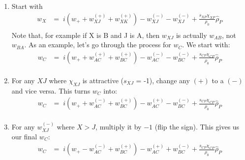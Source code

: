 \documentclass{article}
\begin{document}
  \begin{enumerate}
    \item Start with
    {
      \begin{align*}
        w_X &=\;
          i \left( w_+ + w_{XJ}^{(+)} + w_{XK}^{(+)} \right)
          - w_{XJ}^{(-)} - w_{XJ}^{(-)}
          + \frac{s_{XP}\chi_{XP}}{\rho_0} \hat{\rho}_P \\
      \end{align*}
    }
    Note that, for example if X is B and J is A, then $w_{XJ}$ is actually $w_{AB}$,
      not $w_{BA}$.
    As an example, let's go through the process for $w_C$.
    We start with:
    {
      \begin{align*}
        w_C &=\;
          i \left( w_+ + w_{AC}^{(+)} + w_{BC}^{(+)} \right)
          - w_{AC}^{(-)} - w_{BC}^{(-)}
      + \frac{s_{CP}\chi_{CP}}{\rho_0} \hat{\rho}_P \\
      \end{align*}
    }
    \item For any $XJ$ where $\chi_{XJ}$ is attractive ($s_{XJ}$ = -1), change any
      $(+)$ to a $(-)$ and vice versa.
    This turns $w_C$ into:
    {
      \begin{align*}
        w_C &=\;
          i \left( w_+ + w_{AC}^{(-)} + w_{BC}^{(+)} \right)
          - w_{AC}^{(+)} - w_{BC}^{(-)}
      + \frac{s_{CP}\chi_{CP}}{\rho_0} \hat{\rho}_P \\
      \end{align*}
    }
    \item For any $w_{XJ}^{(-)}$ where $X > J$, multiply it by $-1$ (flip the sign).
    This gives us our final $w_C$:  
    {     
      \begin{align*}
        w_C &=\;
          i \left( w_+ - w_{AC}^{(-)} + w_{BC}^{(+)} \right)
          - w_{AC}^{(+)} + w_{BC}^{(-)}
      + \frac{s_{CP}\chi_{CP}}{\rho_0} \hat{\rho}_P \\
      \end{align*}
    }
  \end{enumerate}
  
  
\end{document}
